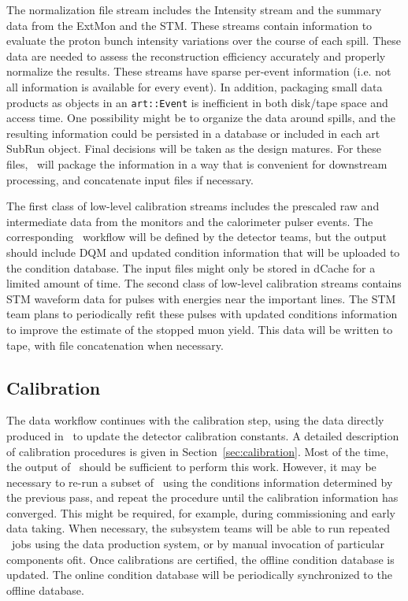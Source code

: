 The normalization file stream includes the Intensity stream and the summary data from the ExtMon and the STM. These streams contain information to evaluate the proton bunch intensity variations over the course of each spill. These data are needed to assess the reconstruction efficiency accurately and properly normalize the results. These streams have sparse per-event information (i.e. not all information is available for every event). In addition, packaging small data products as objects in an {\tt art::Event} is inefficient in both disk/tape space and access time. One possibility might be to organize the data around spills, and the resulting information could be persisted in a database or included in each art SubRun object. Final decisions will be taken as the design matures. For these files, \passone\ will package the information in a way that is convenient for downstream processing, and concatenate input files if necessary.

The first class of low-level calibration streams includes the prescaled raw and intermediate data from the monitors and the calorimeter pulser events. The corresponding \passone\ workflow will be defined by the detector teams, but the output should include DQM and updated condition information that will be uploaded to the condition database. The input files might only be stored in dCache for a limited amount of time. The second class of low-level calibration streams contains STM waveform data for pulses with energies near the important lines. The STM team plans to periodically refit these pulses with updated conditions information to improve the estimate of the stopped muon yield. This data will be written to tape, with file concatenation when necessary.


\subsection{Calibration}
The data workflow continues with the calibration step, using the data directly produced in \passone\ to update the detector calibration constants. A detailed description of calibration procedures is given in Section~\ref{sec:calibration}. Most of the time, the output of \passone\ should be sufficient to perform this work. However, it may be necessary to re-run a subset of \passone\ using the conditions information determined by the previous pass, and repeat the procedure until the calibration information has converged. This might be required, for example, during commissioning and early data taking. When necessary, the subsystem teams will be able to run repeated \passone\ jobs using the data production system, or by manual invocation of particular components ofit. Once calibrations are certified, the offline condition database is updated. The online condition database will be periodically synchronized to the offline database.


